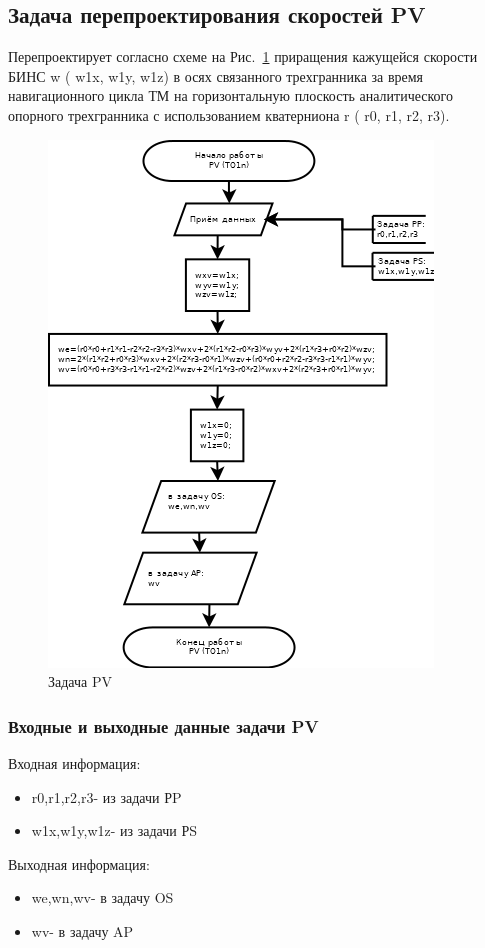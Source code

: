 \subsection{Задача перепроектирования скоростей PV}
Перепроектирует согласно схеме на Рис.~\ref{fig:PV} приращения  кажущейся скорости БИНС  w ( w1x, w1y, w1z)  
в осях связанного трехгранника  за время  навигационного  цикла  ТМ  на  горизонтальную плоскость аналитического  опорного трехгранника 
с использованием кватерниона  r ( r0,  r1,  r2,  r3).
\begin{figure}[H]
    \centering
    \includegraphics[width=0.5\linewidth]{images/PV.png}
    \caption{Задача PV}
    \label{fig:PV}
\end{figure}
\subsubsection{Входные и выходные данные задачи PV}
Входная информация:
\begin{itemize}
\item r0,r1,r2,r3- из задачи  РP
\item w1x,w1y,w1z- из задачи  РS 
\end{itemize}
Выходная информация:
\begin{itemize}
\item we,wn,wv- в задачу OS
\item wv- в задачу AP
\end{itemize}
